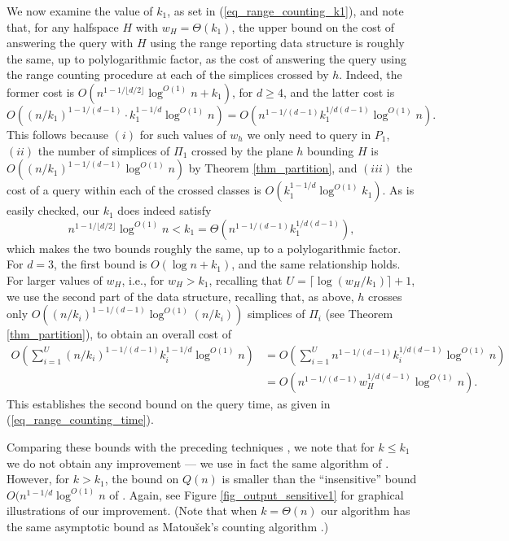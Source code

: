 \documentclass[11pt]{article}
\begin{document}
We now examine the value of $k_{1}$, as set in (\ref{eq_range_counting_k1}), and note that, for any halfspace $H$ with $w_{H} = \Theta(k_{1})$, the upper bound on the cost of answering the query with $H$ using the range reporting data structure is roughly the same, up to polylogarithmic factor, as the cost of answering the query using the range counting procedure at each of the simplices crossed by $h$. Indeed, the former cost is $O(n^{1-1/ \lfloor d/2 \rfloor} \log^{O(1)}n + k_{1})$, for $d \geq 4$, and the latter cost is
$$
O\left((n/k_{1})^{1-1/(d-1)} \cdot k_{1}^{1-1/d} \log^{O(1)}n \right) = O\left(n^{1-1/(d-1)} k_{1}^{1/d(d-1)} \log^{O(1)}n \right).
$$
This follows because $(i)$ for such values of $w_{h}$ we only need to query in $P_{1}$, $(ii)$ the number of simplices of $\Pi_{1}$ crossed by the plane $h$ bounding $H$ is $O((n/k_{1})^{1-1/(d-1)}\log^{O(1)}n)$ by Theorem \ref{thm_partition}, and $(iii)$ the cost of a query within each of the crossed classes is $O(k_{1}^{1-1/d}\log^{O(1)}k_{1})$. As is easily checked, our $k_{1}$ does indeed satisfy
$$
n^{1-1/\lfloor d/2 \rfloor} \log^{O(1)}n < k_{1} = \Theta\left(n^{1-1/(d-1)}k_{1}^{1/d(d-1)}\right),
$$
which makes the two bounds roughly the same, up to a polylogarithmic factor. For $d = 3$, the first bound is $O(\log n + k_{1})$, and the same relationship holds. For larger values of $w_{H}$, i.e., for $w_{H} > k_{1}$, recalling that $U = \lceil \log(w_{H}/k_{1}) \rceil + 1$, we use the second part of the data structure, recalling that, as above, $h$ crosses only $O((n/k_{i})^{1-1/(d-1)} \log^{O(1)}(n/k_{i}))$ simplices of $\Pi_{i}$ (see Theorem \ref{thm_partition}), to obtain an overall cost of
\begin{align*}
O\left(\sum_{i=1}^{U}(n/k_{i})^{1-1/(d-1)} k_{i}^{1-1/d} \log^{O(1)}n \right) & = O\left(\sum_{i=1}^{U}n^{1-1/(d-1)} k_{i}^{1/d(d-1)} \log^{O(1)}n \right) \\
& = O\left(n^{1-1/(d-1)} w_{H}^{1/d(d-1)} \log^{O(1)}n \right).
\end{align*}
This establishes the second bound on the query time, as given in (\ref{eq_range_counting_time}).

Comparing these bounds with the preceding techniques \cite{mat92a,mat92b}, we note that for $k \leq k_{1}$ we do not obtain any improvement --- we use in fact the same algorithm of \cite{mat92b}. However, for $k > k_{1}$, the bound on $Q(n)$ is smaller than the ``insensitive'' bound $O(n^{1-1/d} \log^{O(1)}n$ of \cite{mat92a}. Again, see Figure \ref{fig_output_sensitive1} for  graphical illustrations of our improvement. (Note that when $k = \Theta(n)$ our algorithm has the same asymptotic bound as Matou\v{s}ek's counting algorithm \cite{mat92a}.)
\end{document}
